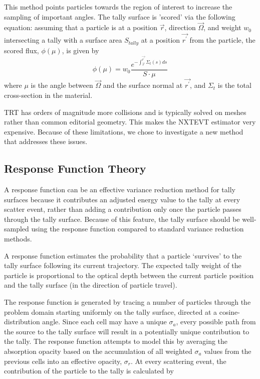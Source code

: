 This method points particles towards the region of interest to increase the sampling of important angles. The tally surface is 'scored' via the following equation: assuming that a particle is at a position $\vec{r}$, direction $\vec{\Omega}$, and weight $w_{0}$ intersecting a tally with a surface area $S_{tally}$ at a position $\vec{r^{\prime}}$ from the particle, the scored flux, $\phi(\mu)$, is given by
\begin{equation}
\phi(\mu) = w_{0} \frac{e^{-\int_{\vec{r}}^{\vec{r^{\prime}}} \Sigma_{t}(s)ds}}{S \cdot \mu}
\end{equation}
where $\mu$ is the angle between $\vec{\Omega}$ and the surface normal at $\vec{r^{\prime}}$, and $\Sigma_{t}$ is the total cross-section in the material. 

TRT has orders of magnitude more collisions and is typically solved on meshes rather than common editorial geometry. This makes the NXTEVT estimator very expensive. Because of these limitations, we chose to investigate a new method that addresses these issues. 

\subsection{Response Function Theory}
A response function can be an effective variance reduction method for tally surfaces because it contributes an adjusted energy value to the tally at every scatter event, rather than adding a contribution only once the particle passes through the tally surface. Because of this feature, the tally surface should be well-sampled using the response function compared to standard variance reduction methods. 

A response function estimates the probability that a particle `survives' to the tally surface following its current trajectory. The expected tally weight of the particle is proportional to the optical depth between the current particle position and the tally surface (in the direction of particle travel).

The response function is generated by tracing a number of particles through the problem domain starting uniformly on the tally surface, directed at a cosine-distribution angle. Since each cell may have a unique $\sigma_{a}$, every possible path from the source to the tally surface will result in a potentially unique contribution to the tally. The response function attempts to model this by averaging the absorption opacity based on the accumulation of all weighted $\sigma_{a}$ values from the previous cells into an effective opacity, $\sigma_{r}$. At every scattering event, the contribution of the particle to the tally is calculated by

